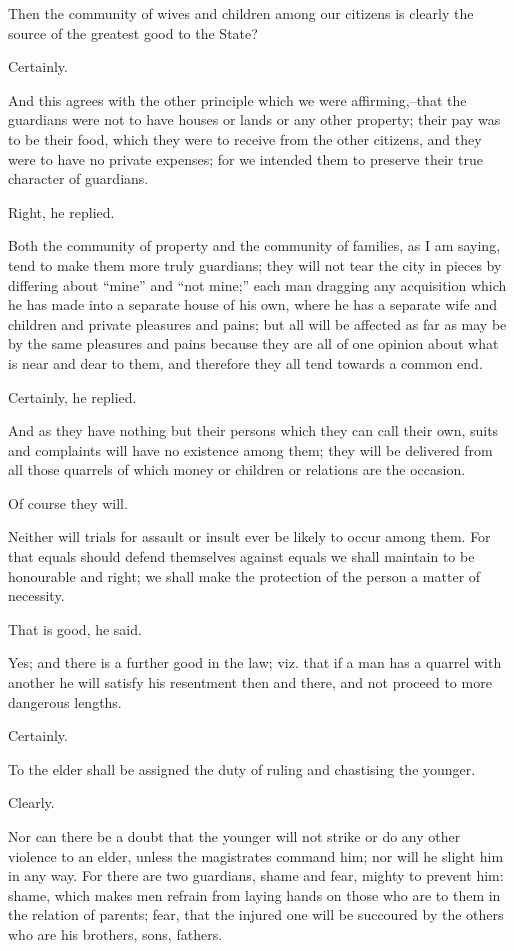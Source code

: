Then the community of wives and children among our citizens is clearly
the source of the greatest good to the State?

Certainly.

And this agrees with the other principle which we were affirming,--that
the guardians were not to have houses or lands or any other property;
their pay was to be their food, which they were to receive from the
other citizens, and they were to have no private expenses; for we
intended them to preserve their true character of guardians.

Right, he replied.

Both the community of property and the community of families, as I am
saying, tend to make them more truly guardians; they will not tear
the city in pieces by differing about ``mine'' and ``not mine;'' each man
dragging any acquisition which he has made into a separate house of his
own, where he has a separate wife and children and private pleasures and
pains; but all will be affected as far as may be by the same pleasures
and pains because they are all of one opinion about what is near and
dear to them, and therefore they all tend towards a common end.

Certainly, he replied.

And as they have nothing but their persons which they can call their
own, suits and complaints will have no existence among them; they will
be delivered from all those quarrels of which money or children or
relations are the occasion.

Of course they will.

Neither will trials for assault or insult ever be likely to occur among
them. For that equals should defend themselves against equals we shall
maintain to be honourable and right; we shall make the protection of the
person a matter of necessity.

That is good, he said.

Yes; and there is a further good in the law; viz. that if a man has a
quarrel with another he will satisfy his resentment then and there, and
not proceed to more dangerous lengths.

Certainly.

To the elder shall be assigned the duty of ruling and chastising the
younger.

Clearly.

Nor can there be a doubt that the younger will not strike or do any
other violence to an elder, unless the magistrates command him; nor will
he slight him in any way. For there are two guardians, shame and fear,
mighty to prevent him: shame, which makes men refrain from laying hands
on those who are to them in the relation of parents; fear, that the
injured one will be succoured by the others who are his brothers, sons,
fathers.

